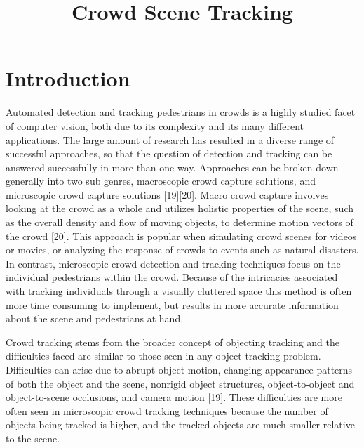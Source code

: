 \documentclass[conference]{IEEEtran}
\begin{document}
 
\title{Crowd Scene Tracking}

\author{
\and
{}
\and
{}
\and
{}
}

\maketitle

\section{Introduction}

Automated detection and tracking pedestrians in crowds is a highly studied facet of computer vision, both due to its complexity and its many different applications. The large amount of research has resulted in a diverse range of successful approaches, so that the question of detection and tracking can be answered successfully in more than one way. Approaches can be broken down generally into two sub genres, macroscopic crowd capture solutions, and microscopic crowd capture solutions [19][20]. Macro crowd capture involves looking at the crowd as a whole and utilizes holistic properties of the scene, such as the overall density and flow of moving objects, to determine motion vectors of the crowd [20]. This approach is popular when simulating crowd scenes for videos or movies, or analyzing the response of crowds to events such as natural disasters. In contrast, microscopic crowd detection and tracking techniques focus on the individual pedestrians within the crowd. Because of the intricacies associated with tracking individuals through a visually cluttered space this method is often more time consuming to implement, but results in more accurate information about the scene and pedestrians at hand. 

Crowd tracking stems from the broader concept of objecting tracking and the difficulties faced are similar to those seen in any object tracking problem. Difficulties can arise due to abrupt object motion, changing appearance patterns of both the object and the scene, nonrigid object structures, object-to-object and object-to-scene occlusions, and camera motion [19]. These difficulties are more often seen in microscopic crowd tracking techniques because the number of objects being tracked is higher, and the tracked objects are much smaller relative to the scene. 
\end{document}
